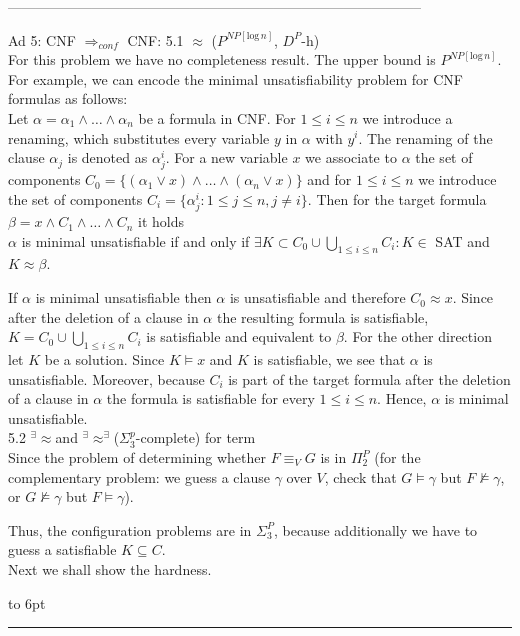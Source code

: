 \documentclass[12pt]{article}
\newcommand{\AEQB}{\mbox{$^\exists\!\!\approx^\exists$}}
\newcommand{\AEQ}{\mbox{$^\exists\!\!\approx$}}
\newenvironment{proof}{\parindent=0pt{\bf Proof: }}{
   \hspace*{\fill}\hbox to 6pt{\leaders\hrule width 6pt height 6pt\hfill}\par}
\begin{document}
-----------------------------------------------------------------------------------------



\begin{proof}
Ad 5: CNF $\Rightarrow_{conf}$ CNF:
5.1  $\approx$ ($P^{NP[\text{log}\, n]}$, $D^P$-h)\\
For this problem we have no completeness result. The upper bound is $P^{NP[\text{log}\, n]}$.
For example, we can encode the minimal unsatisfiability problem for CNF formulas as follows:\\
Let $\alpha= \alpha_1 \wedge \ldots \wedge \alpha_n$ be a formula in CNF.  For $1 \leq i \leq n$ we introduce a renaming, which substitutes every variable $y$ in $\alpha$ with $y^i$. The renaming of the clause $\alpha_j$ is denoted as $\alpha^i_j$.
For a new variable $x$ we associate to $\alpha$ the set of components
$C_0 =\{(\alpha_1 \vee x) \wedge \ldots \wedge (\alpha_n \vee x)\}$ and for $1 \leq i \leq n$ we introduce the set of components
$ C_i=\{\alpha^i_j : 1 \leq j \leq n, j\not = i\}$. Then for the target formula $\beta = x \wedge C_1 \wedge \ldots \wedge C_n$ it holds\\
$\alpha$ is minimal unsatisfiable if and only if $\exists K \subset C_0 \cup \bigcup_{1 \leq i \leq n} C_i:
K \in$ SAT and $K \approx \beta$.

If $\alpha$ is minimal unsatisfiable then $\alpha $ is unsatisfiable and therefore $C_0 \approx x$. Since
after the deletion of a clause in $\alpha$ the resulting formula is satisfiable, $K = C_0 \cup \bigcup_{1 \leq i \leq n} C_i$ is satisfiable and equivalent to $\beta$. For the other direction let $K$ be a solution. Since $K \models x$
and $K$ is satisfiable, we see that $\alpha$ is  unsatisfiable. Moreover, because $C_i$ is part of the target
formula after the deletion of a clause in $\alpha$ the formula is satisfiable for every $1 \leq i \leq n$. Hence,
$\alpha$ is minimal unsatisfiable.\\

5.2 \AEQ and \AEQB ($\Sigma^p_3$-complete) for term\\

Since the problem of determining whether $F\equiv_V G$  is in $\Pi_2^P$ (for the complementary problem: we guess a clause $\gamma$ over $V$, check that $G\models \gamma$ but $F\not\models \gamma$, or $G\not\models\gamma$ but $F\models\gamma$).

Thus, the  configuration problems are in $\Sigma_3^P$, because additionally we have to guess a satisfiable $K\subseteq C$.\\
Next we shall show the hardness.


\end{proof}
\end{document}

